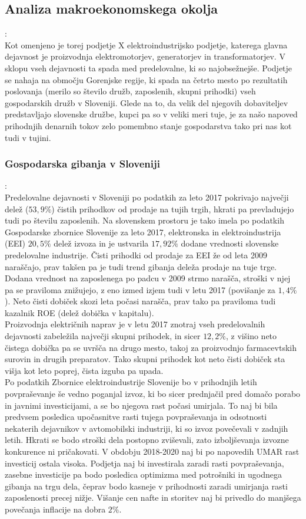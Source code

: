 \documentclass[12pt,a4paper]{amsart}
\theoremstyle{definition} %
\theoremstyle{plain} %
\begin{document}
\subsection{Analiza makroekonomskega okolja}:\\
Kot omenjeno je torej podjetje X elektroindustrijsko podjetje, katerega glavna dejavnost je proizvodnja elektromotorjev, generatorjev in transformatorjev. V sklopu vseh dejavnosti ta spada med predelovalne, ki so najobsežnejše. Podjetje se nahaja na območju Gorenjske regije, ki spada na četrto mesto po rezultatih poslovanja (merilo so število družb, zaposlenih, skupni prihodki) vseh gospodarskih družb v Sloveniji. Glede na to, da velik del njegovih dobaviteljev predstavljajo slovenske družbe, kupci pa so v veliki meri tuje, je za našo napoved prihodnjih denarnih tokov zelo pomembno stanje gospodarstva tako pri nas kot tudi v tujini.

\subsubsection{Gospodarska gibanja v Sloveniji}:\\
Predelovalne dejavnosti v Sloveniji po podatkih za leto 2017 pokrivajo največji delež ($53,9\%$) čistih prihodkov od prodaje na tujih trgih, hkrati pa prevladujejo tudi po številu zaposlenih. 
Na slovenskem prostoru je tako imela po podatkih Gospodarske zbornice Slovenije za leto 2017, elektronska in elektroindustrija (EEI) $20,5\%$ delež izvoza in je ustvarila $17,92\%$ dodane vrednosti slovenske predelovalne industrije. Čisti prihodki od prodaje za EEI že od leta 2009 naraščajo, prav takšen pa je tudi trend gibanja deleža prodaje na tuje trge. Dodana vrednost na zaposlenega po padcu v 2009 strmo narašča, stroški v njej pa se praviloma znižujejo, z eno izmed izjem tudi v letu 2017 (povišanje za $1,4\%$). Neto čisti dobiček skozi leta počasi narašča, prav tako pa praviloma tudi kazalnik ROE (delež dobička v kapitalu).\\
Proizvodnja električnih naprav je v letu 2017 znotraj vseh predelovalnih dejavnosti zabeležila največji skupni prihodek, in sicer $12,2\%$, z višino neto čistega dobička pa se uvršča na drugo mesto, takoj za proizvodnjo farmacevtskih surovin in drugih preparatov. Tako skupni prihodek kot neto čisti dobiček sta višja kot leto poprej, čista izguba pa upada.\\
Po podatkih Zbornice elektroindustrije Slovenije bo v prihodnjih letih povpraševanje še vedno poganjal izvoz, ki bo sicer prednjačil pred domačo porabo in javnimi investicijami, a se bo njegova rast počasi umirjala. To naj bi bila predvsem posledica upočasnitve rasti tujega povpraševanja in odsotnosti nekaterih dejavnikov v avtomobilski industriji, ki so izvoz povečevali v zadnjih letih. Hkrati se bodo stroški dela postopno zviševali, zato izboljševanja izvozne konkurence ni pričakovati. V obdobju 2018-2020 naj bi po napovedih UMAR rast investicij ostala visoka. Podjetja naj bi investirala zaradi rasti povpraševanja, zasebne investicije pa bodo posledica optimizma med potrošniki in ugodnega gibanja na trgu dela, čeprav bodo kasneje v prihodnosti zaradi umirjanja rasti zaposlenosti precej nižje. Višanje cen nafte in storitev naj bi privedlo do manjšega povečanja inflacije na dobra $2\%$.
\end{document}
